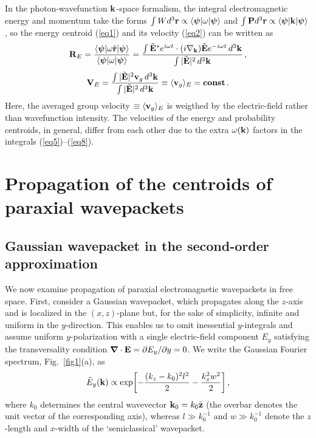 \documentclass[12pt, a4paper, superscriptaddress, final]{iopart}
\begin{document}
In the photon-wavefunction ${\bf k}$-space formalism, the integral electromagnetic energy and momentum take the forms $\int W d^3{\bf r} \propto \langle {\bm \psi} | \omega | {\bm \psi} \rangle$ and $\int {\bf P} d^3{\bf r} \propto \langle {\bm \psi} | {\bf k} | {\bm \psi} \rangle$, so the energy centroid (\ref{eq1}) and its velocity (\ref{eq2}) can be written as 
%
\begin{equation}
\label{eq7}
{\bf R}_E = \frac{\langle {\bm \psi} | \omega \hat{\bf r} | {\bm \psi} \rangle}{\langle {\bm \psi} | \omega | {\bm \psi} \rangle} =
\frac{ \int  \tilde{\bf E}^*e^{i\omega t} \cdot (i{\nabla}_{\bf k}) \tilde{\bf E}e^{-i\omega t} \, d^3{\bf k}}{\int |\tilde{\bf E}|^2 \, d^3{\bf k}}\,,
 \end{equation}
%	
%
\begin{equation}
\label{eq8}
{\bf V}_E = \frac{ \int  |\tilde{\bf E}|^2 {\bf v}_g \, d^3{\bf k}}{\int  |\tilde{\bf E}|^2 \, d^3{\bf k}}
\equiv \langle {\bf v}_g \rangle_E = {\bf const}\,.
 \end{equation}
%
Here, the averaged group velocity $\equiv \langle {\bf v}_g \rangle_E$ is weigthed by the electric-field rather than wavefunction intensity. The velocities of the energy and probability centroids, in general, differ from each other due to the extra $\omega ({\bf k})$ factors in the integrals (\ref{eq5})--(\ref{eq8}).

\section{Propagation of the centroids of paraxial wavepackets}

\subsection{Gaussian wavepacket in the second-order approximation}

We now examine propagation of paraxial electromagnetic wavepackets in free space. First, consider a Gaussian wavepacket, which propagates along the $z$-axis and is localized in the $(x,z)$-plane but, for the sake of simplicity, infinite and uniform in the $y$-direction. This enables us to omit inessential $y$-integrals and assume uniform $y$-polarization with a single electric-field component $E_y$ satisfying the transversality condition ${\bm \nabla} \cdot {\bf E} = \partial E_y / \partial y =0$. 
We write the Gaussian Fourier spectrum, Fig.~\ref{fig1}(a), as
%
\begin{equation}
\label{eq9}
\tilde{E}_y ({\bf k}) \propto \exp\!\left[ -\frac{(k_z-k_0)^2 l^2}{2} - \frac{k_x^2 w^2}{2} \right],
 \end{equation}
%	
where $k_0$ determines the central wavevector 
${\bf k}_0 = k_0 \bar{\bf z}$ (the overbar denotes the unit vector of the corresponding axis), whereas $l \gg k_0^{-1}$ and $w \gg k_0^{-1}$ denote the $z$-length and $x$-width of the `semiclassical' wavepacket. 
\end{document}
